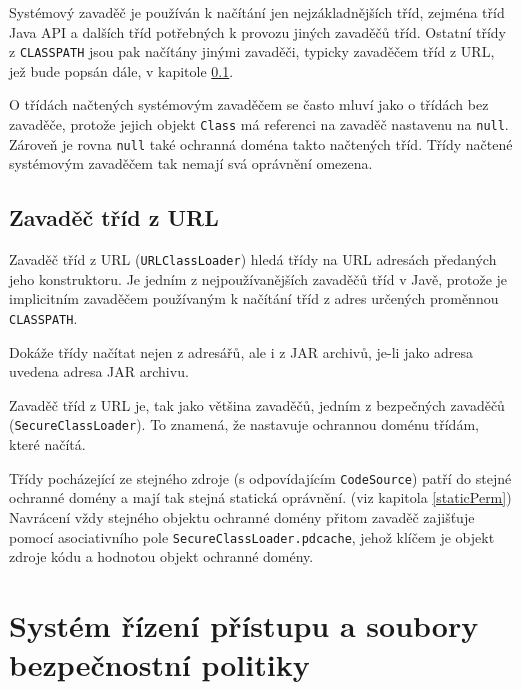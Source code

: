 Systémový zavaděč je používán k načítání jen nejzákladnějších tříd, zejména tříd Java API a dalších tříd potřebných k provozu jiných zavaděčů tříd.
Ostatní třídy z {\tt CLASSPATH} jsou pak načítány jinými zavaděči, typicky zavaděčem tříd z URL, jež bude popsán dále, v kapitole \ref{URLClassLoader}.

O třídách načtených systémovým zavaděčem se často mluví jako o třídách bez zavaděče, protože jejich objekt {\tt Class} má referenci na zavaděč nastavenu na {\tt null}. \cite[3.2.1]{oaks} Zároveň je rovna {\tt null} také ochranná doména takto načtených tříd. Třídy načtené systémovým zavaděčem tak nemají svá oprávnění omezena. \cite[5.4]{oaks}

\subsection{Zavaděč tříd z URL} \label{URLClassLoader}

Zavaděč tříd z URL ({\tt URLClassLoader}) hledá třídy na URL adresách předaných jeho konstruktoru. Je jedním z nejpoužívanějších zavaděčů tříd v Javě,
protože je implicitním zavaděčem používaným k načítání tříd z adres určených proměnnou {\tt CLASSPATH}.

Dokáže třídy načítat nejen z adresářů, ale i z JAR archivů, je-li jako adresa uvedena adresa JAR archivu. \cite[3.2.5]{oaks}

Zavaděč tříd z URL je, tak jako většina zavaděčů, jedním z bezpečných zavaděčů ({\tt SecureClassLoader}).
To znamená, že nastavuje ochrannou doménu třídám, které načítá.

Třídy pocházející ze stejného zdroje (s odpovídajícím {\tt CodeSource}) patří do stejné ochranné domény a mají tak stejná statická oprávnění.
(viz kapitola \ref{staticPerm})
Navrácení vždy stejného objektu ochranné domény přitom zavaděč zajišťuje pomocí asociativního pole {\tt SecureClassLoader.pdcache},
jehož klíčem je objekt zdroje kódu a hodnotou objekt ochranné domény.
\cite{sourceSecureClassLoader}

\section{Systém řízení přístupu a soubory bezpečnostní politiky}

